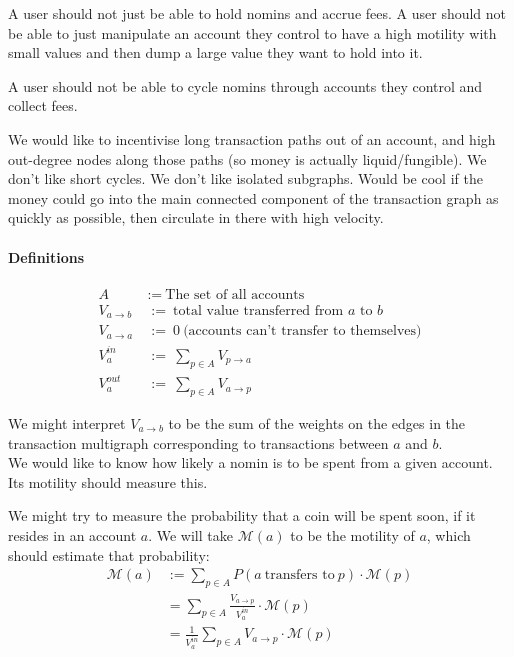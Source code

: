 \documentclass{article}
\begin{document}
A user should not just be able to hold nomins and accrue fees. A user should not be able to just manipulate 
an account they control to have a high motility with small values and then dump a large value they want to hold
into it.

A user should not be able to cycle nomins through accounts they control and collect fees.

We would like to incentivise long transaction paths out of an account, and high out-degree nodes along those paths
(so money is actually liquid/fungible).
We don't like short cycles. We don't like isolated subgraphs. Would be cool if the money could go into the main
connected component of the transaction graph as quickly as possible, then circulate in there with high velocity.


\paragraph{Definitions}
\begin{align*}
    A \ &:= \ \text{The set of all accounts} \\
    V_{a \rightarrow b} \ &:= \ \text{total value transferred from \(a\) to \(b\)} \\
    V_{a \rightarrow a} \ &:= \ 0 \ \text{(accounts can't transfer to themselves)} \\
    V_{a}^{in} \ &:= \ \sum_{p \in A}{V_{p \rightarrow a}} \\
    V_{a}^{out} \ &:= \ \sum_{p \in A}{V_{a \rightarrow p}}
\end{align*}

We might interpret \(V_{a \rightarrow b}\) to be the sum of the weights on the edges in
the transaction multigraph corresponding to transactions between \(a\) and \(b\). \\

We would like to know how likely a nomin is to be spent from a given account. Its motility should measure this.

We might try to measure the probability that a coin will be spent soon, if it resides in an account \(a\).
We will take \(\mathcal{M}(a)\) to be the motility of \(a\), which should estimate that probability:
\begin{align*}
    \mathcal{M}(a) &:= \sum_{p \in A}{P(a \ \text{transfers to} \ p) \cdot \mathcal{M}(p)} \\
    &= \sum_{p \in A}{\frac{V_{a \rightarrow p}}{V_{a}^{in}} \cdot \mathcal{M}(p)} \\
    &= \frac{1}{V_{a}^{in}} \sum_{p \in A}{V_{a \rightarrow p} \cdot \mathcal{M}(p)}
\end{align*}
\end{document}
